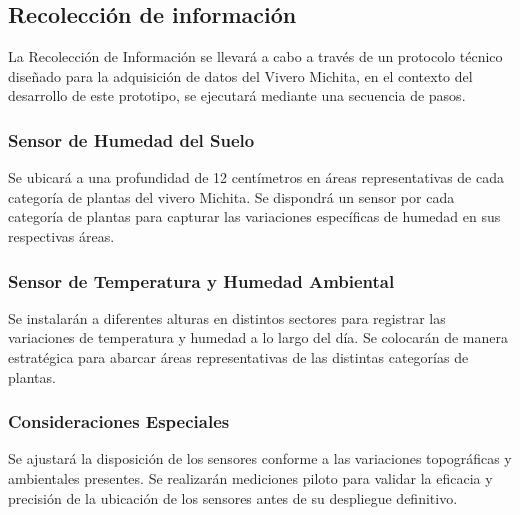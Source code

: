 \subsection{Recolección de información}
\bigbreak
La Recolección de Información se llevará a cabo a través de un protocolo técnico diseñado para la adquisición de datos del Vivero Michita, en el contexto del desarrollo de este prototipo, se ejecutará mediante una secuencia de pasos.

\subsubsection*{Sensor de Humedad del Suelo}
Se ubicará a una profundidad de 12 centímetros en áreas representativas de cada categoría de plantas del vivero Michita. Se dispondrá un sensor por cada categoría de plantas para capturar las variaciones específicas de humedad en sus respectivas áreas.

\subsubsection*{Sensor de Temperatura y Humedad Ambiental}
Se instalarán a diferentes alturas en distintos sectores para registrar las variaciones de temperatura y humedad a lo largo del día. Se colocarán de manera estratégica para abarcar áreas representativas de las distintas categorías de plantas.

\subsubsection*{Consideraciones Especiales}
Se ajustará la disposición de los sensores conforme a las variaciones topográficas y ambientales presentes. Se realizarán mediciones piloto para validar la eficacia y precisión de la ubicación de los sensores antes de su despliegue definitivo.